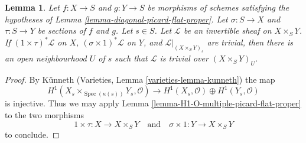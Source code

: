 \documentclass[10pt,a4paper]{amsart}
\theoremstyle{plain}
\newtheorem{lemma}[subsection]{Lemma}
\theoremstyle{definition}
\theoremstyle{remark}
\numberwithin{equation}{subsection}
\def\Spec{\mathop{\mathrm{Spec}}}
\begin{document}
\begin{lemma}
\label{lemma-pic-of-product}
Let $f : X \to S$ and $g : Y \to S$ be morphisms of schemes
satisfying the hypotheses of Lemma \ref{lemma-diagonal-picard-flat-proper}.
Let $\sigma : S \to X$ and $\tau : S \to Y$ be sections of
$f$ and $g$. Let $s \in S$.
Let $\mathcal{L}$ be an invertible sheaf on $X \times_S Y$.
If $(1 \times \tau)^*\mathcal{L}$ on $X$, $(\sigma \times 1)^*\mathcal{L}$
on $Y$, and $\mathcal{L}|_{(X \times_S Y)_s}$ are trivial, then
there is an open neighbourhood $U$ of $s$ such that
$\mathcal{L}$ is trivial over $(X \times_S Y)_U$.
\end{lemma}

\begin{proof}
By K\"unneth (Varieties, Lemma \ref{varieties-lemma-kunneth})
the map
$$
H^1(X_s \times_{\Spec(\kappa(s))} Y_s, \mathcal{O}) \to
H^1(X_s, \mathcal{O}) \oplus H^1(Y_s, \mathcal{O})
$$
is injective. Thus we may
apply Lemma \ref{lemma-H1-O-multiple-picard-flat-proper}
to the two morphisms
$$
1 \times \tau : X \to X \times_S Y
\quad\text{and}\quad
\sigma \times 1 : Y \to X \times_S Y
$$
to conclude.
\end{proof}
\end{document}
